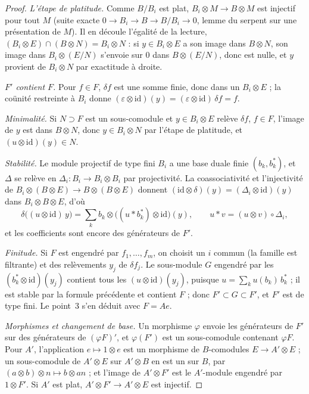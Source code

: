 \begin{proof}
\emph{L'étape de platitude.} Comme $B/B_i$ est plat, $B_i \otimes M \to B \otimes M$ est injectif pour tout $M$ (suite exacte $0 \to B_i \to B \to B/B_i \to 0$, lemme du serpent sur une présentation de $M$). Il en découle l'égalité de la lecture, $(B_i \otimes E) \cap (B \otimes N) = B_i \otimes N$ : si $y \in B_i \otimes E$ a son image dans $B \otimes N$, son image dans $B_i \otimes (E/N)$ s'envoie sur $0$ dans $B \otimes (E/N)$, donc est nulle, et $y$ provient de $B_i \otimes N$ par exactitude à droite.

\emph{$F'$ contient $F$.} Pour $f \in F$, $\delta f$ est une somme finie, donc dans un $B_i \otimes E$ ; la coünité restreinte à $B_i$ donne $(\varepsilon \otimes \mathrm{id})(y) = (\varepsilon \otimes \mathrm{id})\,\delta f = f$.

\emph{Minimalité.} Si $N \supset F$ est un sous-comodule et $y \in B_i \otimes E$ relève $\delta f$, $f \in F$, l'image de $y$ est dans $B \otimes N$, donc $y \in B_i \otimes N$ par l'étape de platitude, et $(u \otimes \mathrm{id})(y) \in N$.

\emph{Stabilité.} Le module projectif de type fini $B_i$ a une base duale finie $(b_k, b_k^*)$, et $\Delta$ se relève en $\Delta_i \colon B_i \to B_i \otimes B_i$ par projectivité. La coassociativité et l'injectivité de $B_i \otimes (B \otimes E) \to B \otimes (B \otimes E)$ donnent $(\mathrm{id} \otimes \delta)(y) = (\Delta_i \otimes \mathrm{id})(y)$ dans $B_i \otimes B \otimes E$, d'où
\[
\delta\big((u \otimes \mathrm{id})\,y\big) = \sum_k b_k \otimes \big((u * b_k^*) \otimes \mathrm{id}\big)(y), \qquad u * v = (u \otimes v) \circ \Delta_i ,
\]
et les coefficients sont encore des générateurs de $F'$.

\emph{Finitude.} Si $F$ est engendré par $f_1, \dots, f_m$, on choisit un $i$ commun (la famille est filtrante) et des relèvements $y_j$ de $\delta f_j$. Le sous-module $G$ engendré par les $(b_k^* \otimes \mathrm{id})(y_j)$ contient tous les $(u \otimes \mathrm{id})(y_j)$, puisque $u = \sum_k u(b_k)\, b_k^*$ ; il est stable par la formule précédente et contient $F$ ; donc $F' \subset G \subset F'$, et $F'$ est de type fini. Le point~3 s'en déduit avec $F = A e$.

\emph{Morphismes et changement de base.} Un morphisme $\varphi$ envoie les générateurs de $F'$ sur des générateurs de $(\varphi F)'$, et $\varphi(F')$ est un sous-comodule contenant $\varphi F$. Pour $A'$, l'application $e \mapsto 1 \otimes e$ est un morphisme de $B$-comodules $E \to A' \otimes E$ ; un sous-comodule de $A' \otimes E$ sur $A' \otimes B$ en est un sur $B$, par $(a \otimes b) \otimes n \mapsto b \otimes a n$ ; et l'image de $A' \otimes F'$ est le $A'$-module engendré par $1 \otimes F'$. Si $A'$ est plat, $A' \otimes F' \to A' \otimes E$ est injectif.
\end{proof}

